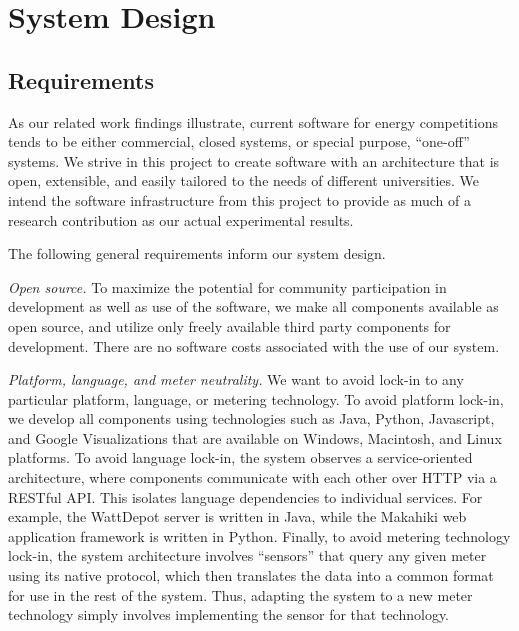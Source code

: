 
\section{System Design}
\label{sec:system-design}

\subsection{Requirements}

As our related work findings illustrate, current software for energy
competitions tends to be either commercial, closed systems, or special
purpose, ``one-off'' systems.  We strive in this project to create
software with an architecture that is open, extensible, and easily tailored
to the needs of different universities.  We intend the software
infrastructure from this project to provide as much of a research
contribution as our actual experimental results.

The following general requirements inform our system design.

{\em Open source.}  To maximize the potential for community
participation in development as well as use of the software, we make
all components available as open source, and utilize only freely
available third party components for development.  There are no software
costs associated with the use of our system.

{\em Platform, language, and meter neutrality.}  We want to avoid lock-in
to any particular platform, language, or metering technology.  To avoid
platform lock-in, we develop all components using technologies such as
Java, Python, Javascript, and Google Visualizations that are available on
Windows, Macintosh, and Linux platforms.  To avoid language lock-in, the
system observes a service-oriented architecture, where components
communicate with each other over HTTP via a RESTful API.  This isolates
language dependencies to individual services.  For example, the WattDepot
server is written in Java, while the Makahiki web application framework is
written in Python.  Finally, to avoid metering technology lock-in, the
system architecture involves ``sensors'' that query any given meter using
its native protocol, which then translates the data into a common format for use in
the rest of the system.  Thus, adapting the system to a new meter
technology simply involves implementing the sensor for that technology.

